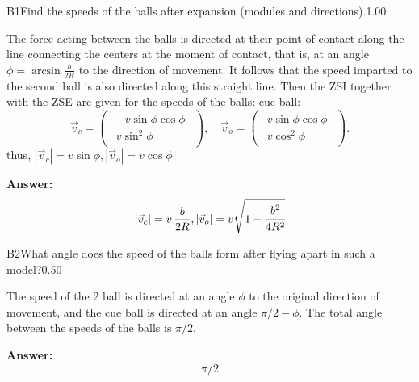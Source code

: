\documentclass[11pt,a4paper]{article}
\begin{document}
\begin{solcard}{B1}{Find the speeds of the balls after expansion (modules and directions).}{1.00}

The force acting between the balls is directed at their point of contact along the line connecting the centers at the moment of contact, that is, at an angle $\phi=\arcsin \frac{b}{2 R}$ to the direction of movement. It follows that the speed imparted to the second ball is also directed along this straight line. Then the ZSI together with the ZSE are given for the speeds of the balls: cue ball: $$\vec{v}_{c}=\left(\begin{array}{c}\begin{array}{c}-v \sin \phi \cos \phi \\ v \sin ^{2} \phi\end{array}\end{array}\right),\quad\vec{v}_{o}=\left(\begin{array}{c}\begin{array}{c}v \sin \phi \cos \phi \\ v \cos ^{2} \phi\end{array}\end{array}\right).$$ thus, $\left|\vec{v}_{c}\right|=v \sin \phi,\left|\vec{v}_{o}\right|=v \cos \phi$

\par\smallskip\noindent\textbf{Answer:} $$\left|\vec{v}_{c}\right|=v\,\frac{b}{2 R},\left|\vec{v}_{o}\right|=v\sqrt{1-\cfrac{b^2}{4R^2}}$$
\end{solcard}

\begin{solcard}{B2}{What angle does the speed of the balls form after flying apart in such a model?}{0.50}

The speed of the 2 ball is directed at an angle $\phi$ to the original direction of movement, and the cue ball is directed at an angle $\pi/2-\phi$. The total angle between the speeds of the balls is $\pi/2$.

\par\smallskip\noindent\textbf{Answer:} $$\pi/2$$
\end{solcard}
\end{document}
